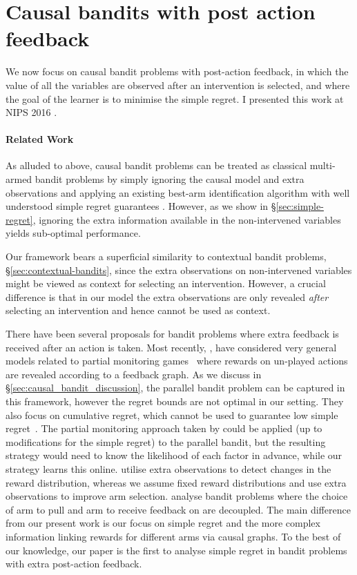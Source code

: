 \documentclass[11pt,a4paper,oneside]{book}
\theoremstyle{plain}
\theoremstyle{definition}
\begin{document}
\section{Causal bandits with post action feedback}

We now focus on causal bandit problems with post-action feedback, in which the value of all the variables are observed after an intervention is selected, and where the goal of the learner is to minimise the simple regret. I presented this work at NIPS 2016 \citep{NIPS2016_6195}.

\paragraph{Related Work} As alluded to above, causal bandit problems can be treated as classical multi-armed bandit problems by simply ignoring the causal model and extra observations and applying an existing best-arm identification algorithm with well understood simple regret guarantees \citep{Jamieson2013}. However, as we show in \S\ref{sec:simple-regret}, ignoring the extra information available in the non-intervened variables yields sub-optimal performance.

Our framework bears a superficial similarity to contextual bandit problems, \S\ref{sec:contextual-bandits}, since the extra observations on non-intervened variables might be viewed as context for selecting an intervention. 
However, a crucial difference is that in our model the extra observations are only revealed \emph{after} selecting an intervention and hence cannot be used as context. 

There have been several proposals for bandit problems where extra feedback is received after an action is taken.
Most recently, \citet{Alon2015}, \citet{Kocak2014} have considered very general models related to partial monitoring games~\citep{Bartok2014} where rewards on un-played actions are revealed according to a feedback graph. As we discuss in \S\ref{sec:causal_bandit_discussion}, the parallel bandit problem can be captured in this framework, however the regret bounds are not optimal in our setting. They also focus on cumulative regret, which cannot be used to guarantee low simple regret~\citep{Bubeck2009a}. The partial monitoring approach taken by \citet{wu2015online} could be applied (up to modifications for the simple regret) to the parallel bandit, but the resulting strategy would need to know the likelihood of each factor in advance, while our strategy learns this online. \citet{Yu2009} utilise extra observations to detect changes in the reward distribution, whereas we assume fixed reward distributions and use extra observations to improve arm selection. \citet{Avner2012} analyse bandit problems where the choice of arm to pull and arm to receive feedback on are decoupled. The main difference from our present work is our focus on simple regret and the more complex information linking rewards for different arms via causal graphs. To the best of our knowledge, our paper is the first to analyse simple regret in bandit problems with extra post-action feedback.
\end{document}
